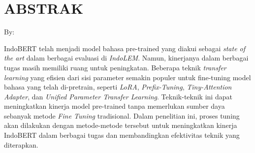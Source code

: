 \clearpage
\chapter*{ABSTRAK}

\begin{center}
    \center
    \begin{singlespace}
        \large\bfseries\MakeUppercase{\thetitle}
    
        \normalfont\normalsize
        By:
    
        \bfseries \theauthor
    \end{singlespace}
\end{center} 


\begin{singlespace}
    IndoBERT telah menjadi model bahasa pre-trained yang diakui sebagai \textit{state of the art} dalam berbagai evaluasi di \textit{IndoLEM}.
    Namun, kinerjanya dalam berbagai tugas masih memiliki ruang untuk peningkatan. 
    Beberapa teknik \textit{transfer learning} yang efisien dari sisi parameter semakin populer 
    untuk fine-tuning model bahasa yang telah di-pretrain, seperti \textit{LoRA}, \textit{Prefix-Tuning}, \textit{Tiny-Attention Adapter}, dan \textit{Unified Parameter Transfer Learning}. 
    Teknik-teknik ini dapat meningkatkan kinerja model pre-trained tanpa memerlukan sumber daya sebanyak metode \textit{Fine Tuning} tradisional. 
    Dalam penelitian ini, proses tuning akan dilakukan dengan metode-metode tersebut untuk meningkatkan kinerja IndoBERT dalam berbagai tugas dan membandingkan efektivitas teknik yang diterapkan.
\end{singlespace}
\clearpage

\clearpage